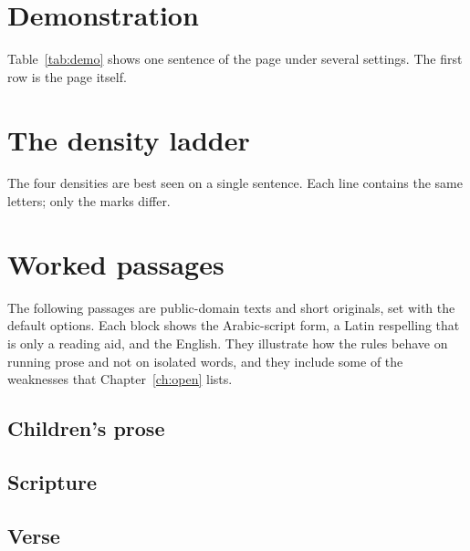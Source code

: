 \section{Demonstration}
Table~\ref{tab:demo} shows one sentence of the page under several settings. The first row is the page itself.

\begin{table}[ht]\centering\small

\caption{One sentence in several settings. The second row is the computed form with the defaults.}\label{tab:demo}
\end{table}

\section{The density ladder}
The four densities are best seen on a single sentence. Each line contains the same letters; only the marks differ.

\begin{table}[ht]\centering\small

\caption{One sentence at each density.}\label{tab:density}
\end{table}

\section{Worked passages}
The following passages are public-domain texts and short originals, set with the default options. Each block shows the Arabic-script form, a Latin respelling that is only a reading aid, and the English. They illustrate how the rules behave on running prose and not on isolated words, and they include some of the weaknesses that Chapter~\ref{ch:open} lists.

\subsection{Children's prose}


\subsection{Scripture}


\subsection{Verse}



